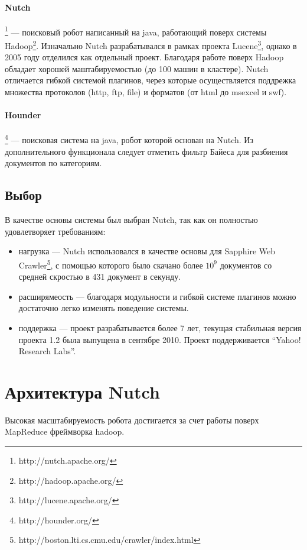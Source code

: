 \paragraph{Nutch}\footnote{http://nutch.apache.org/} --- поисковый робот написанный на java, работающий поверх системы Hadoop\footnote{http://hadoop.apache.org/}. Изначально Nutch разрабатывался в рамках проекта Lucene\footnote{http://lucene.apache.org/}, однако в 2005 году отделился как отдельный проект. Благодаря работе поверх Hadoop обладает хорошей маштабируемостью (до 100 машин в кластере). Nutch отличается гибкой системой плагинов, через которые осуществляется поддрежка множества протоколов (http, ftp, file) и форматов (от html до msexcel и swf).
\paragraph{Hounder}\footnote{http://hounder.org/} --- поисковая система на java, робот которой основан на Nutch. Из дополнительного функционала следует отметить фильтр Байеса для разбиения документов по категориям.

\subsection{Выбор}
В качестве основы системы был выбран Nutch, так как он полностью удовлетворяет требованиям:
\begin{itemize}
 \item нагрузка --- Nutch использовался в качестве основы для Sapphire Web Crawler\footnote{http://boston.lti.cs.cmu.edu/crawler/index.html}, с помощью которого было скачано более $10^{9}$ документов со средней скростью в 431 документ в секунду.
 \item расширямеость --- благодаря модульности и гибкой системе плагинов можно достаточно легко изменять поведение системы.
 \item поддержка --- проект разрабатывается более 7 лет, текущая стабильная версия проекта 1.2 была выпущена в сентябре 2010. Проект поддерживается ``Yahoo! Research Labs''.
\end{itemize}

\section{Архитектура Nutch}
Высокая масштабируемость робота достигается за счет работы поверх MapReduce фреймворка hadoop.
